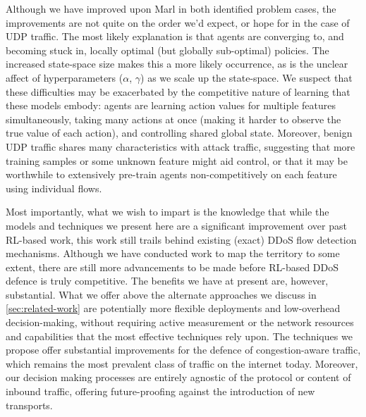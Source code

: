 \documentclass[10pt, times, comsoc]{IEEEtran}
\begin{document}
Although we have improved upon Marl in both identified problem cases, the improvements are not quite on the order we'd expect, or hope for in the case of UDP traffic.
The most likely explanation is that agents are converging to, and becoming stuck in, locally optimal (but globally sub-optimal) policies.
The increased state-space size makes this a more likely occurrence, as is the unclear affect of hyperparameters ($\alpha$, $\gamma$) as we scale up the state-space.
We suspect that these difficulties may be exacerbated by the competitive nature of learning that these models embody: agents are learning action values for multiple features simultaneously, taking many actions at once (making it harder to observe the true value of each action), and controlling shared global state.
Moreover, benign UDP traffic shares many characteristics with attack traffic, suggesting that more training samples or some unknown feature might aid control, or that it may be worthwhile to extensively pre-train agents non-competitively on each feature using individual flows.


Most importantly, what we wish to impart is the knowledge that while the models and techniques we present here are a significant improvement over past RL-based work, this work still trails behind existing (exact) DDoS flow detection mechanisms.
Although we have conducted work to map the territory to some extent, there are still more advancements to be made before RL-based DDoS defence is truly competitive.
The benefits we have at present are, however, substantial.
What we offer above the alternate approaches we discuss in \cref{sec:related-work} are potentially more flexible deployments and low-overhead decision-making, without requiring active measurement or the network resources and capabilities that the most effective techniques rely upon.
The techniques we propose offer substantial improvements for the defence of congestion-aware traffic, which remains the most prevalent class of traffic on the internet today.
Moreover, our decision making processes are entirely agnostic of the protocol or content of inbound traffic, offering future-proofing against the introduction of new transports.
\end{document}
